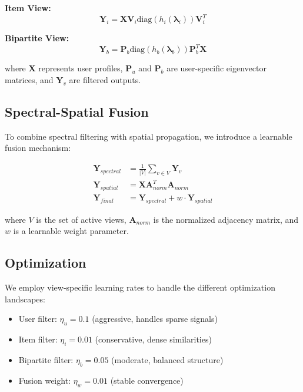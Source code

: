 \documentclass[10pt,twocolumn,letterpaper]{article}
\begin{document}
\textbf{Item View:}
\begin{equation}
\mathbf{Y}_i = \mathbf{X} \mathbf{V}_i \text{diag}(h_i(\boldsymbol{\lambda}_i)) \mathbf{V}_i^T
\end{equation}

\textbf{Bipartite View:}
\begin{equation}
\mathbf{Y}_b = \mathbf{P}_b \text{diag}(h_b(\boldsymbol{\lambda}_b)) \mathbf{P}_b^T \mathbf{X}
\end{equation}

where $\mathbf{X}$ represents user profiles, $\mathbf{P}_u$ and $\mathbf{P}_b$ are user-specific eigenvector matrices, and $\mathbf{Y}_v$ are filtered outputs.

\subsection{Spectral-Spatial Fusion}

To combine spectral filtering with spatial propagation, we introduce a learnable fusion mechanism:

\begin{align}
\mathbf{Y}_{spectral} &= \frac{1}{|V|} \sum_{v \in V} \mathbf{Y}_v \\
\mathbf{Y}_{spatial} &= \mathbf{X} \mathbf{A}_{norm}^T \mathbf{A}_{norm} \\
\mathbf{Y}_{final} &= \mathbf{Y}_{spectral} + w \cdot \mathbf{Y}_{spatial}
\end{align}

where $V$ is the set of active views, $\mathbf{A}_{norm}$ is the normalized adjacency matrix, and $w$ is a learnable weight parameter.

\subsection{Optimization}

We employ view-specific learning rates to handle the different optimization landscapes:
\begin{itemize}
    \item User filter: $\eta_u = 0.1$ (aggressive, handles sparse signals)
    \item Item filter: $\eta_i = 0.01$ (conservative, dense similarities)  
    \item Bipartite filter: $\eta_b = 0.05$ (moderate, balanced structure)
    \item Fusion weight: $\eta_w = 0.01$ (stable convergence)
\end{itemize}
\end{document}
